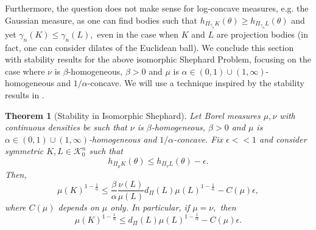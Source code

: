 \documentclass[11pt]{amsart}
\newtheorem{theorem}{Theorem}[section]
\theoremstyle{definition}
\theoremstyle{remark}
\numberwithin{equation}{section}
\newcommand{\conbod}{\mathcal{K}^n}
\begin{document}
Furthermore, the question does not make sense for log-concave measures, e.g. the Gaussian measure, as one can find bodies such that $h_{\Pi_{\gamma_n}K}(\theta)\geq h_{\Pi_{\gamma_n}L}(\theta)$ and yet $\gamma_n(K)\le \gamma_n(L),$ even in the case when $K$ and $L$ are projection bodies (in fact, one can consider dilates of the Euclidean ball). We conclude this section with stability results for the above isomorphic Shephard Problem, focusing on the case where $\nu$ is $\beta$-homogeneous, $\beta>0$ and $\mu$ is $\alpha\in(0,1)\cup(1,\infty)$-homogeneous and $1/\alpha$-concave. We will use a technique inspired by the stability results in \cite{AK05}.
\begin{theorem}[Stability in Isomorphic Shephard]
Let Borel measures $\mu,\nu$ with continuous densities be such that $\nu$ is $\beta$-homogeneous, $\beta>0$ and $\mu$ is $\alpha\in(0,1)\cup(1,\infty)$-homogeneous and $1/\alpha$-concave. Fix $\epsilon<<1$ and consider symmetric $K,L\in\conbod_0$ such that
$$h_{\Pi_{\mu} K}(\theta)\leq h_{\Pi_{\nu} L}(\theta)-\epsilon.$$
Then,
$$\mu(K)^{1-\frac{1}{\alpha}}\leq \frac{\beta}{\alpha}\frac{\nu(L)}{\mu(L)}d_{\Pi}(L)\mu(L)^{1-\frac{1}{\alpha}}-C(\mu)\epsilon,$$
where $C(\mu)$ depends on $\mu$ only. In particular, if $\mu=\nu,$ then
$$\mu(K)^{1-\frac{1}{\alpha}}\leq d_{\Pi}(L)\mu(L)^{1-\frac{1}{\alpha}}-C(\mu)\epsilon.$$
\end{theorem}
\end{document}
